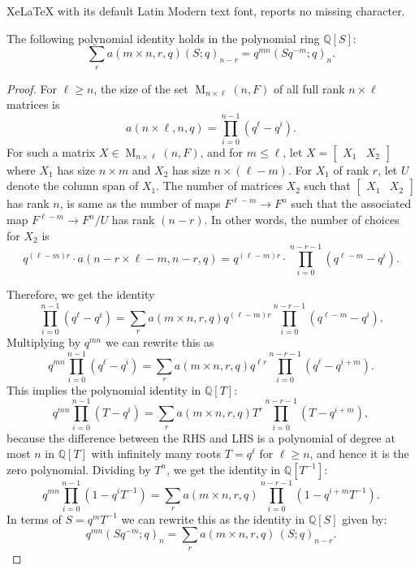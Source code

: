 \documentclass[10pt,a4paper]{amsart}
\DeclareMathOperator{\M}{M}
\newcommand{\bQ}{\mathbb Q}
\begin{document}
XeLaTeX with its default Latin Modern text font, reports no missing character.
\begin{lemma} \label{amnr_lemma}
The following polynomial identity holds in the polynomial ring  $\bQ[S]$:
\[\sum_r a(m \times n,r, q) (S;q)_{n-r}= q^{mn} (Sq^{-m};q)_n.\] 
\end{lemma}

\begin{proof}
For $\ell \geq n$, the size of the set $\M_{n \times \ell}(n,F)$ of all full rank $n \times \ell $ matrices is 
 \[ a( n\times \ell, n,q)=\prod_{i=0}^{n-1} (q^\ell-q^i).\]
 For such a matrix $X \in \M_{n \times \ell}(n,F)$, and for $m \leq \ell$,  let $X=\begin{bmatrix}  X_1 &  X_2 \end{bmatrix}$ where $X_1$ has size $n \times m$ and $X_2$ has size $ n \times (\ell-m)$. 
For $X_1$ of rank $r$, let $U$ denote the column span of $X_1$. The number of matrices $X_2$ such that 
$\begin{bmatrix}  X_1 &  X_2 \end{bmatrix}$ has rank $n$, is same as the number of maps $F^{\ell-m} \to F^n$ such that the associated map $F^{\ell-m} \to F^n/U$ has rank $(n-r)$. In other words, the number of choices for $X_2$ is \[ q^{(\ell-m)r} \cdot a(n-r \times \ell-m, n-r, q)= q^{(\ell-m)r} \cdot \prod_{i=0}^{n-r-1}(q^{\ell-m}-q^i). \]
 
 
 Therefore, we get the identity
\[  \prod_{i=0}^{n-1} (q^\ell-q^i)=\sum_{r} a(m \times n, r, q) q^{(\ell-m)r} \prod_{i=0}^{n-r-1}(q^{\ell-m}-q^i). \]
Multiplying 
 by $q^{mn}$ we can rewrite this as 
 \[  q^{mn} \prod_{i=0}^{n-1} (q^\ell-q^i)=\sum_{r} a(m \times n, r, q) q^{\ell r} \prod_{i=0}^{n-r-1}(q^{\ell}-q^{i+m}). \]
This implies the polynomial identity in $\bQ[T]$:
\[
q^{mn} \prod_{i=0}^{n-1} (T-q^i)=
\sum_{r} a(m \times n, r, q) T^{r} \prod_{i=0}^{n-r-1}(T-q^{i+m}),
\]
because the difference between the RHS and LHS is a polynomial of degree at most $n$ in $\bQ[T]$ with infinitely many roots $T=q^\ell$ for $\ell \geq n$, and hence it is the  zero polynomial. Dividing by $T^n$, we get the identity in $\bQ[T^{-1}]$:
\[
q^{mn} \prod_{i=0}^{n-1} (1 -q^i T^{-1})=
\sum_{r} a(m \times n, r, q)   \prod_{i=0}^{n-r-1}(1-q^{i+m}T^{-1}).
\]
In terms of $S=q^{m}T^{-1}$ we can rewrite this as the identity in $\bQ[S]$ given by:
\[
q^{mn}(Sq^{-m};q)_n=
\sum_{r} a(m \times n, r, q) \, 
(S;q)_{n-r}.
\]
\end{proof}
\end{document}
